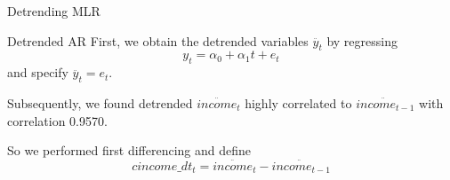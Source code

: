\documentclass[compress]{beamer}
\begin{document}
\begin{frame}{Detrending MLR}
\begin{table}[!htbp]
\end{table} 
\end{frame}

\begin{frame}{Detrended AR}
  First, we obtain the detrended variables $\ddot{y_t}$ by regressing
  \begin{equation}
    y_t=\alpha_0+\alpha_1 t+e_t
  \end{equation}
  and specify $\ddot{y_t}=e_t$.

  Subsequently, we found detrended $\ddot{income_t}$ highly correlated to $\ddot{income_{t-1}}$ with correlation 0.9570.
  
  So we performed first differencing and define
  \begin{equation}
    cincome\_ dt_t=\ddot{income_t}-\ddot{income_{t-1}}
  \end{equation}
\end{frame}
\end{document}
